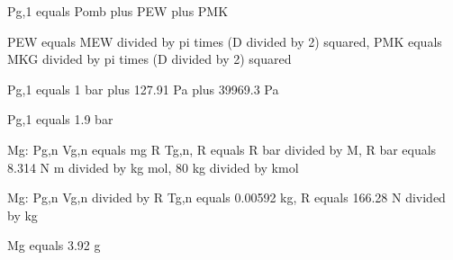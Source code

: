 Pg,1 equals Pomb plus PEW plus PMK

PEW equals MEW divided by pi times (D divided by 2) squared, PMK equals MKG divided by pi times (D divided by 2) squared

Pg,1 equals 1 bar plus 127.91 Pa plus 39969.3 Pa

Pg,1 equals 1.9 bar

Mg: Pg,n Vg,n equals mg R Tg,n, R equals R bar divided by M, R bar equals 8.314 N m divided by kg mol, 80 kg divided by kmol

Mg: Pg,n Vg,n divided by R Tg,n equals 0.00592 kg, R equals 166.28 N divided by kg

Mg equals 3.92 g
